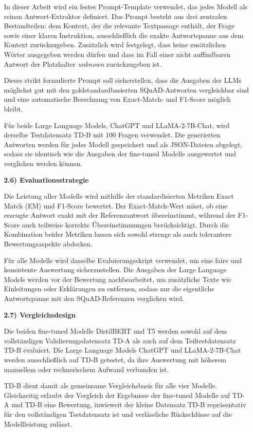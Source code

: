 \documentclass[12pt,oneside]{article}
\begin{document}
In dieser Arbeit wird ein festes Prompt-Template verwendet, das jedes
Modell als reinen Antwort-Extraktor definiert. Das Prompt besteht aus
drei zentralen Bestandteilen: dem Kontext, der die relevante Textpassage
enthält, der Frage sowie einer klaren Instruktion, ausschließlich die
exakte Antwortspanne aus dem Kontext zurückzugeben. Zusätzlich wird
festgelegt, dass keine zusätzlichen Wörter ausgegeben werden dürfen und
dass im Fall einer nicht auffindbaren Antwort der Platzhalter
\emph{unknown} zurückzugeben ist.

Dieses strikt formulierte Prompt soll sicherstellen, dass die Ausgaben
der LLMs möglichst gut mit den goldstandardbasierten SQuAD-Antworten
vergleichbar sind und eine automatische Berechnung von Exact-Match- und
F1-Score möglich bleibt.

Für beide Large Language Models, ChatGPT und LLaMA-2-7B-Chat, wird
derselbe Testdatensatz TD-B mit 100 Fragen verwendet. Die generierten
Antworten werden für jedes Modell gespeichert und als JSON-Dateien
abgelegt, sodass sie identisch wie die Ausgaben der fine-tuned Modelle
ausgewertet und verglichen werden können.

\textbf{2.6) Evaluationsstrategie}

Die Leistung aller Modelle wird mithilfe der standardisierten Metriken
Exact Match (EM) und F1-Score bewertet. Der Exact-Match-Wert misst, ob
eine erzeugte Antwort exakt mit der Referenzantwort übereinstimmt,
während der F1-Score auch teilweise korrekte Übereinstimmungen
berücksichtigt. Durch die Kombination beider Metriken lassen sich sowohl
strenge als auch tolerantere Bewertungsaspekte abdecken.

Für alle Modelle wird dasselbe Evaluierungsskript verwendet, um eine
faire und konsistente Auswertung sicherzustellen. Die Ausgaben der Large
Language Models werden vor der Bewertung nachbearbeitet, um zusätzliche
Texte wie Einleitungen oder Erklärungen zu entfernen, sodass nur die
eigentliche Antwortspanne mit den SQuAD-Referenzen verglichen wird.

\textbf{2.7) Vergleichsdesign}

Die beiden fine-tuned Modelle DistilBERT und T5 werden sowohl auf dem
vollständigen Validierungsdatensatz TD-A als auch auf dem
Teiltestdatensatz TD-B evaluiert. Die Large Language Models ChatGPT und
LLaMA-2-7B-Chat werden ausschließlich auf TD-B getestet, da ihre
Auswertung mit höherem manuellem oder rechnerischem Aufwand verbunden
ist.

TD-B dient damit als gemeinsame Vergleichsbasis für alle vier Modelle.
Gleichzeitig erlaubt der Vergleich der Ergebnisse der fine-tuned Modelle
auf TD-A und TD-B eine Bewertung, inwieweit der kleine Datensatz TD-B
repräsentativ für den vollständigen Testdatensatz ist und verlässliche
Rückschlüsse auf die Modellleistung zulässt.
  
\end{document}
